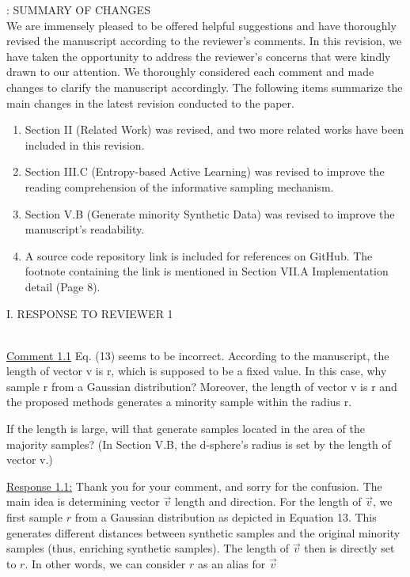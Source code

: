\fontsize{12}{21}\selectfont
\onecolumn


 \Methodname{}: SUMMARY OF CHANGES
\\

We are immensely pleased to be offered helpful suggestions and have thoroughly revised the manuscript according to the reviewer’s comments. In this revision, we have taken the opportunity to address the reviewer’s concerns that were kindly drawn to our attention. We thoroughly considered each comment and made changes to clarify the manuscript accordingly. The following items summarize the main changes in the latest revision conducted to the paper.

\begin{enumerate}
	
	\item Section II (Related Work) was revised, and two more related works have been included in this revision. 
	
	\item Section III.C (Entropy-based Active Learning) was revised to improve the reading comprehension of the informative sampling mechanism.
	
	\item Section V.B (Generate minority Synthetic Data) was revised to improve the  manuscript's readability.

	\item A source code repository link is included for references on GitHub. The footnote containing the link is mentioned in Section VII.A Implementation detail (Page 8).  
	  
\end{enumerate}




\newpage

I. RESPONSE TO REVIEWER 1

~\\
\color{blue}
\underline{Comment 1.1}
Eq. (13) seems to be incorrect. According to the manuscript, the length of vector v is r, which is supposed to be a fixed value. In this case, why sample r from a Gaussian distribution? Moreover, the length of vector v is r and the proposed methods generates a minority sample within the radius r. 

If the length is large, will that generate samples located in the area of the majority samples? (In Section V.B, the d-sphere’s radius is set by the length of vector v.)

\color{black}
\underline{Response 1.1:}
Thank you for your comment, and sorry for the confusion. The main idea is determining vector $\vec{v}$ length and direction. For the length of $\vec{v}$, we first sample $r$ from a Gaussian distribution as depicted in Equation 13. This generates different distances between synthetic samples and the original minority samples (thus, enriching synthetic samples). The length of $\vec{v}$ then is directly set to $r$. In other words, we can consider $r$ as an alias for $\vec{v}$  

